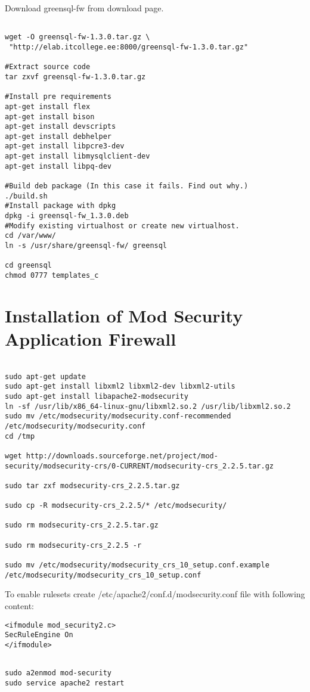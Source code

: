 Download greensql-fw from download page.
\begin{verbatim}

wget -O greensql-fw-1.3.0.tar.gz \
 "http://elab.itcollege.ee:8000/greensql-fw-1.3.0.tar.gz"

#Extract source code
tar zxvf greensql-fw-1.3.0.tar.gz

#Install pre requirements
apt-get install flex
apt-get install bison
apt-get install devscripts
apt-get install debhelper
apt-get install libpcre3-dev
apt-get install libmysqlclient-dev
apt-get install libpq-dev

#Build deb package (In this case it fails. Find out why.)
./build.sh
#Install package with dpkg
dpkg -i greensql-fw_1.3.0.deb
#Modify existing virtualhost or create new virtualhost.
cd /var/www/
ln -s /usr/share/greensql-fw/ greensql

cd greensql
chmod 0777 templates_c
\end{verbatim}

\section{Installation of Mod Security Application Firewall}
\begin{verbatim}

sudo apt-get update
sudo apt-get install libxml2 libxml2-dev libxml2-utils
sudo apt-get install libapache2-modsecurity
ln -sf /usr/lib/x86_64-linux-gnu/libxml2.so.2 /usr/lib/libxml2.so.2
sudo mv /etc/modsecurity/modsecurity.conf-recommended /etc/modsecurity/modsecurity.conf
cd /tmp
 
wget http://downloads.sourceforge.net/project/mod-security/modsecurity-crs/0-CURRENT/modsecurity-crs_2.2.5.tar.gz
 
sudo tar zxf modsecurity-crs_2.2.5.tar.gz
 
sudo cp -R modsecurity-crs_2.2.5/* /etc/modsecurity/
 
sudo rm modsecurity-crs_2.2.5.tar.gz
 
sudo rm modsecurity-crs_2.2.5 -r
 
sudo mv /etc/modsecurity/modsecurity_crs_10_setup.conf.example /etc/modsecurity/modsecurity_crs_10_setup.conf 
\end{verbatim}


To enable rulesets create /etc/apache2/conf.d/modsecurity.conf file with following content:
\begin{verbatim}
<ifmodule mod_security2.c>
SecRuleEngine On
</ifmodule>
\end{verbatim} 
\begin{verbatim}
 
sudo a2enmod mod-security
sudo service apache2 restart

\end{verbatim}



